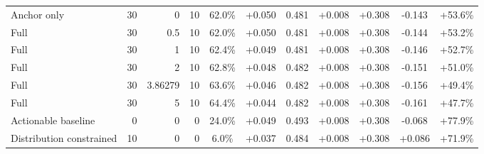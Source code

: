 \begin{table}[htbp]
\begin{tabular}{lrrrccccccc}
Anchor only & 30 & 0 & 10 & 62.0\% & +0.050 & 0.481 & +0.008 & +0.308 & -0.143 & +53.6\% \\
Full & 30 & 0.5 & 10 & 62.0\% & +0.050 & 0.481 & +0.008 & +0.308 & -0.144 & +53.2\% \\
Full & 30 & 1 & 10 & 62.4\% & +0.049 & 0.481 & +0.008 & +0.308 & -0.146 & +52.7\% \\
Full & 30 & 2 & 10 & 62.8\% & +0.048 & 0.482 & +0.008 & +0.308 & -0.151 & +51.0\% \\
Full & 30 & 3.86279 & 10 & 63.6\% & +0.046 & 0.482 & +0.008 & +0.308 & -0.156 & +49.4\% \\
Full & 30 & 5 & 10 & 64.4\% & +0.044 & 0.482 & +0.008 & +0.308 & -0.161 & +47.7\% \\
Actionable baseline & 0 & 0 & 0 & 24.0\% & +0.049 & 0.493 & +0.008 & +0.308 & -0.068 & +77.9\% \\
Distribution constrained & 10 & 0 & 0 & 6.0\% & +0.037 & 0.484 & +0.008 & +0.308 & +0.086 & +71.9\% \\
\bottomrule
\end{tabular}
\end{table}
